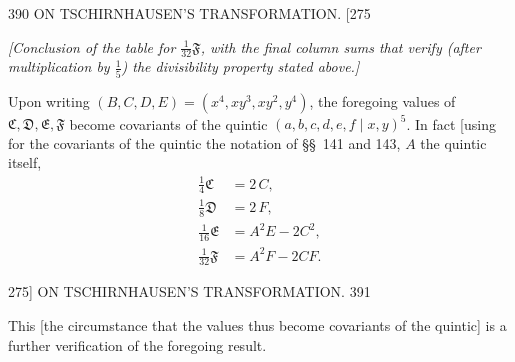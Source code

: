 \documentclass[11pt]{article}
\begin{document}
\begin{center}
390 \hfill ON TSCHIRNHAUSEN'S TRANSFORMATION. \hfill \textsc{[275}
\end{center}

\noindent\textit{[Conclusion of the table for $\tfrac{1}{32}\mathfrak{F}$, with the final column
sums that verify (after multiplication by $\tfrac{1}{5}$) the divisibility property stated
above.]}

\bigskip
Upon writing $(B,C,D,E)=(x^{4},xy^{3},xy^{2},y^{4})$, the foregoing values of $\mathfrak{C},\mathfrak{D},\mathfrak{E},\mathfrak{F}$
become covariants of the quintic $(a,b,c,d,e,f \mid x,y)^{5}$. In fact [using for the covariants
of the quintic the notation of \S\S~141 and 143, $A$ the quintic itself,
\begin{align*}
\tfrac{1}{4}\mathfrak{C} &= 2\,C, \\
\tfrac{1}{8}\mathfrak{D} &= 2\,F, \\
\tfrac{1}{16}\mathfrak{E} &= A^{2}E - 2C^{2}, \\
\tfrac{1}{32}\mathfrak{F} &= A^{2}F - 2CF.
\end{align*}

\begin{center}
\textsc{275]} \hfill ON TSCHIRNHAUSEN'S TRANSFORMATION. \hfill 391
\end{center}

This [the circumstance that the values thus become covariants of the quintic] is a
further verification of the foregoing result.
\end{document}
